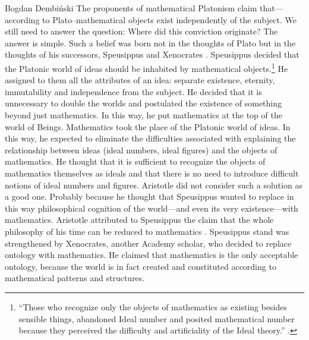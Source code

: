 \begin{artengenv}{Bogdan Dembiński}
The proponents of mathematical Platonism claim that---according to Plato–mathematical %
objects exist independently of the subject. We still need to answer the question: Where did this conviction  %
originate?%
The answer is simple. Such a belief was born not in the thoughts of Plato but in the thoughts of his successors,
Speusippus and Xenocrates
\parencite[see][]{dembinski_pozny_2010,dillon_heirs_2003}.
Speusippus decided that the Platonic world of ideas should be inhabited by mathematical
objects.\footnote{``Those who recognize
only the objects of mathematics as existing besides sensible things, abandoned Ideal number and posited mathematical
number because they perceived the difficulty and artificiality of the Ideal theory.''
\parencite[\textit{Methaphysics}, 1086a]{aristotle_aristotles_1924}.
} He assigned to
them all the attributes of an idea: separate existence, eternity, immutability and independence from the subject. He
decided that it is unnecessary to double the worlds and postulated the existence of something beyond just mathematics.
In this way, he put mathematics at the top of the %
world of Beings. Mathematics took the place of the Platonic world of ideas. In this way, he expected to eliminate the
difficulties associated with explaining the relationship between ideas (ideal numbers, ideal figures) and the objects
of mathematics. He thought that it is sufficient to recognize the objects of mathematics themselves as ideals and that
there is no need to introduce difficult notions of ideal numbers and figures. Aristotle did not consider such a
solution as a good one. Probably because he thought that Speusippus wanted to replace in this way philosophical
cognition of the world---and even its very existence---with mathematics. Aristotle attributed to Speusippus the
claim that the whole philosophy of his time can be reduced to mathematics
\parencite[\textit{Methaphysics}, 992a30]{aristotle_aristotles_1924}.
Speusippus stand was strengthened by Xenocrates, another Academy scholar, who decided to replace
ontology with mathematics. He claimed that mathematics is the only acceptable ontology, because the world is in fact
created and constituted according to mathematical patterns and structures.


\end{artengenv}
